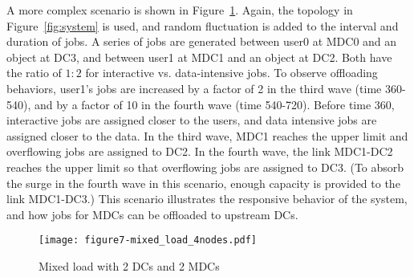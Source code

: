 A more complex scenario is shown in Figure~\ref{fig:mixed}.
Again, the topology in Figure~\ref{fig:system} is used, and
random fluctuation is added to the interval and duration of jobs.
A series of jobs are generated
between user0 at MDC0 and an object at DC3, and
between user1 at MDC1 and an object at DC2.
Both have the ratio of $1:2$ for interactive vs. data-intensive jobs.
To observe offloading behaviors, user1's jobs are increased by a
factor of 2 in the third wave (time 360-540), and by a factor of 10 in
the fourth wave (time 540-720).
Before time 360, interactive jobs are assigned closer to the users,
and data intensive jobs are assigned closer to the data.
In the third wave, MDC1 reaches the upper limit and overflowing jobs are
assigned to DC2.
In the fourth wave, the link MDC1-DC2 reaches the upper limit so that
overflowing jobs are assigned to DC3.
(To absorb the surge in the fourth wave in this scenario, enough
capacity is provided to the link MDC1-DC3.)
This scenario illustrates the responsive behavior of the system,
and how jobs for MDCs can be offloaded to upstream DCs.

\begin{figure}[tb]
  \begin{center}
    \texttt{[image: figure7-mixed\_load\_4nodes.pdf]}
    \vspace{-4.0ex}
    \caption{Mixed load with 2 DCs and 2 MDCs}
    \label{fig:mixed}
  \end{center}
\end{figure}




